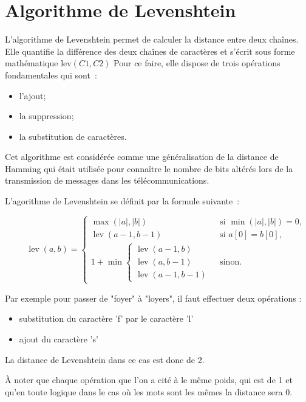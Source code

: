 \documentclass[final, 10pt]{report}
\begin{document}
\section{Algorithme de Levenshtein}

    L'algorithme de Levenshtein permet de calculer la distance entre deux chaînes.
    Elle quantifie la différence des deux chaînes de caractères et s'écrit sous forme mathématique $\text{lev}(C1,C2)$
    Pour ce faire, elle dispose de trois opérations fondamentales qui sont~:
    \begin{itemize}
        \item l'ajout;
        \item la suppression;
        \item la substitution de caractères.
    \end{itemize}
    
    \medskip
    Cet algorithme est considérée comme une généralisation de la distance de Hamming\cite{noauthor_distance_2021-1} qui était utilisée pour connaître le nombre de bits altérés lors de la transmission de messages dans les télécommunications.
    
    L'agorithme de Levenshtein se définit par la formule suivante~:
    
    $$
    {\displaystyle \qquad \operatorname {lev} (a,b)={\begin{cases}\max(|a|,|b|)&{\text{ si }}\min(|a|,|b|)=0,\\\operatorname {lev} (a-1,b-1)&{\text{ si }}a[0]=b[0],\\1+\min {\begin{cases}\operatorname {lev} (a-1,b)\\\operatorname {lev} (a,b-1)\\\operatorname {lev} (a-1,b-1)\end{cases}}&{\text{ sinon.}}\end{cases}}}
     $$



Par exemple pour passer de "foyer" à "loyers", il faut effectuer deux opérations :
\begin{itemize}
    \item substitution du caractère 'f' par le caractère 'l'
    \item ajout du caractère 's'
\end{itemize}
La distance de Levenshtein dans ce cas est donc de 2.

À noter que chaque opération que l'on a cité à le même poids, qui est de 1 et qu'en toute logique dans le cas où les mots sont les mêmes la distance sera 0.
\end{document}
